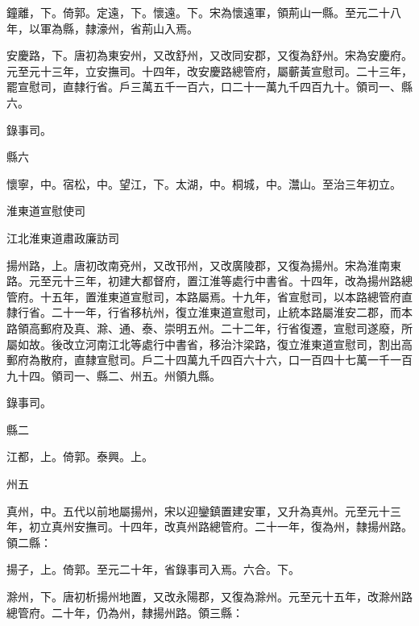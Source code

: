 \begin{pinyinscope}
 鐘離，下。倚郭。定遠，下。懷遠。下。宋為懷遠軍，領荊山一縣。至元二十八年，以軍為縣，隸濠州，省荊山入焉。



 安慶路，下。唐初為東安州，又改舒州，又改同安郡，又復為舒州。宋為安慶府。元至元十三年，立安撫司。十四年，改安慶路總管府，屬蘄黃宣慰司。二十三年，罷宣慰司，直隸行省。戶三萬五千一百六，口二十一萬九千四百九十。領司一、縣六。



 錄事司。



 縣六



 懷寧，中。宿松，中。望江，下。太湖，中。桐城，中。灊山。至治三年初立。



 淮東道宣慰使司



 江北淮東道肅政廉訪司



 揚州路，上。唐初改南兗州，又改邗州，又改廣陵郡，又復為揚州。宋為淮南東路。元至元十三年，初建大都督府，置江淮等處行中書省。十四年，改為揚州路總管府。十五年，置淮東道宣慰司，本路屬焉。十九年，省宣慰司，以本路總管府直隸行省。二十一年，行省移杭州，復立淮東道宣慰司，止統本路屬淮安二郡，而本路領高郵府及真、滁、通、泰、崇明五州。二十二年，行省復遷，宣慰司遂廢，所屬如故。後改立河南江北等處行中書省，移治汴梁路，復立淮東道宣慰司，割出高郵府為散府，直隸宣慰司。戶二十四萬九千四百六十六，口一百四十七萬一千一百九十四。領司一、縣二、州五。州領九縣。



 錄事司。



 縣二



 江都，上。倚郭。泰興。上。



 州五



 真州，中。五代以前地屬揚州，宋以迎鑾鎮置建安軍，又升為真州。元至元十三年，初立真州安撫司。十四年，改真州路總管府。二十一年，復為州，隸揚州路。領二縣：



 揚子，上。倚郭。至元二十年，省錄事司入焉。六合。下。



 滁州，下。唐初析揚州地置，又改永陽郡，又復為滁州。元至元十五年，改滁州路總管府。二十年，仍為州，隸揚州路。領三縣：




\end{pinyinscope}
